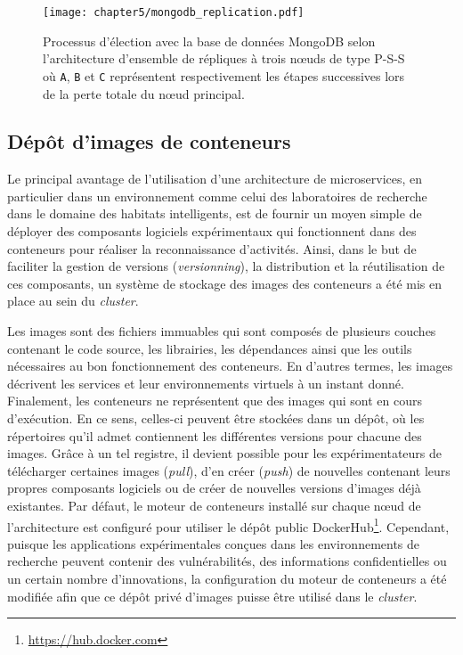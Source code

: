 \begin{figure}[H]
	\centering
	\texttt{[image: chapter5/mongodb\_replication.pdf]}
        \caption{Processus d'élection avec la base de données MongoDB selon l'architecture d'ensemble de répliques à trois n\oe{}uds de type P-S-S où \texttt{A}, \texttt{B} et \texttt{C} représentent respectivement les étapes successives lors de la perte totale du n\oe{}ud principal.}
	\label{fig:mongodb_replication}
\end{figure}

\subsection{Dépôt d'images de conteneurs}

Le principal avantage de l'utilisation d'une architecture de microservices, en particulier dans un environnement comme celui des laboratoires de recherche dans le domaine des habitats intelligents, est de fournir un moyen simple de déployer des composants logiciels expérimentaux qui fonctionnent dans des conteneurs pour réaliser la reconnaissance d'activités. Ainsi, dans le but de faciliter la gestion de versions (\textit{versionning}), la distribution et la réutilisation de ces composants, un système de stockage des images des conteneurs a été mis en place au sein du \textit{cluster}.

Les images sont des fichiers immuables qui sont composés de plusieurs couches contenant le code source, les librairies, les dépendances ainsi que les outils nécessaires au bon fonctionnement des conteneurs. En d'autres termes, les images décrivent les services et leur environnements virtuels à un instant donné. Finalement, les conteneurs ne représentent que des images qui sont en cours d'exécution. En ce sens, celles-ci peuvent être stockées dans un dépôt, où les répertoires qu'il admet contiennent les différentes versions pour chacune des images. Grâce à un tel registre, il devient possible pour les expérimentateurs de télécharger certaines images (\textit{pull}), d'en créer (\textit{push}) de nouvelles contenant leurs propres composants logiciels ou de créer de nouvelles versions d'images déjà existantes. Par défaut, le moteur de conteneurs installé sur chaque n\oe{}ud de l'architecture est configuré pour utiliser le dépôt public DockerHub\footnote{\url{https://hub.docker.com}}. Cependant, puisque les applications expérimentales conçues dans les environnements de recherche peuvent contenir des vulnérabilités, des informations confidentielles ou un certain nombre d'innovations, la configuration du moteur de conteneurs a été modifiée afin que ce dépôt privé d'images puisse être utilisé dans le \textit{cluster}.

